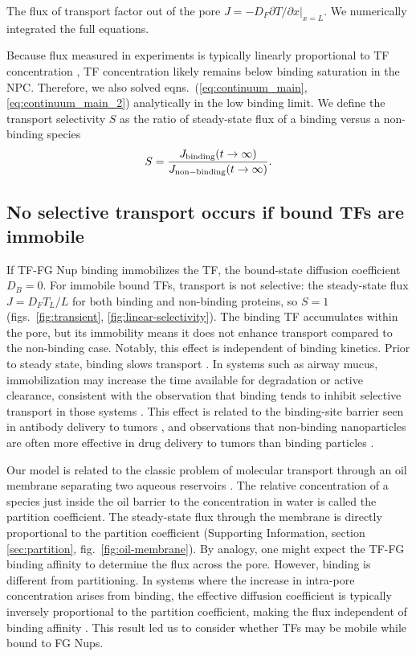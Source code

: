 The flux of transport factor out of the pore
$J = - D_F \left. \partial T/\partial x \right|_{x=L}$. We numerically integrated
the full equations.  

Because flux
measured in experiments is typically linearly proportional to TF
concentration \cite{timney06, schmidt15}, TF concentration likely
remains below binding saturation in the NPC. Therefore, we also solved
eqns.~(\ref{eq:continuum_main}, \ref{eq:continuum_main_2})
analytically in the low binding limit.  We define
the transport selectivity $S$ as the ratio of steady-state flux of a
binding versus a non-binding species 
\begin{equation}
  S =  \frac{J_{\rm binding}(t \to \infty)}{J_{\rm non-binding}(t \to \infty)} .
\end{equation}

\subsection{No selective transport occurs if bound TFs are immobile}
If TF-FG Nup binding immobilizes the TF, the bound-state diffusion
coefficient $D_B = 0$.  For immobile bound TFs, transport is not
selective: the steady-state flux $J = D_F T_L/L $ for both binding and
non-binding proteins, so $S = 1$ (figs.~\ref{fig:transient},
\ref{fig:linear-selectivity}).  The binding TF accumulates within the
pore, but its immobility means it does not enhance transport compared
to the non-binding case.  Notably, this effect is independent of
binding kinetics.  Prior to steady state, binding slows transport
.  In systems such as airway mucus,
immobilization may increase the time available for degradation or
active clearance, consistent with the observation that binding tends
to inhibit selective transport in those systems \cite{schneider17,
  huang17, mastorakos15}.  This effect is related to the binding-site
barrier seen in antibody delivery to tumors \cite{juweid92}, and
observations that non-binding nanoparticles are often more effective
in drug delivery to tumors than binding particles \cite{witten17}.

Our model is related to the classic problem of molecular transport
through an oil membrane separating two aqueous reservoirs
\cite{schafer13}.  The relative concentration of a species just inside
the oil barrier to the concentration in water is called the partition
coefficient.  The steady-state flux through the membrane is directly
proportional to the partition coefficient (Supporting Information,
section \ref{sec:partition}, fig.~\ref{fig:oil-membrane}).  By
analogy, one might expect the TF-FG binding affinity to determine the
flux across the pore. However, binding is different from partitioning.
In systems where the increase in intra-pore concentration arises from
binding, the effective diffusion coefficient is typically inversely
proportional to the partition coefficient, making the flux independent
of binding affinity \cite{bickel02}.  This result led us to consider
whether TFs may be mobile while bound to FG Nups.





